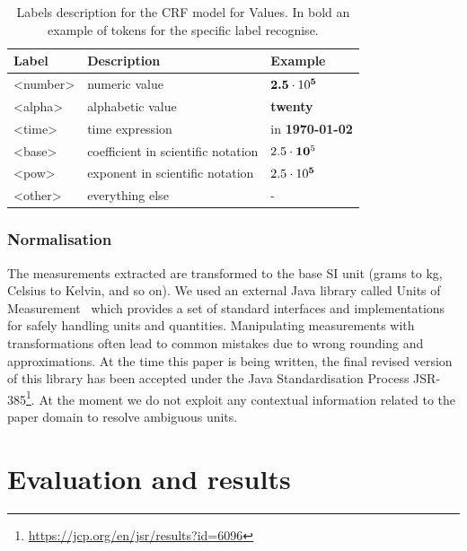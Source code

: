 \documentclass[sigconf]{acmart}
\begin{document}
\begin{table}[ht]
  \caption{Labels description for the CRF model for Values. In bold an example of tokens for the specific label recognise.}
  \label{tab:values-model-labels}
  \begin{tabular}{lll}
    \toprule
    Label & Description & Example\\
    \midrule
    <number> & numeric value & $\textbf{2.5}\cdot10\textsuperscript{\textbf{5}}$ \\
    <alpha> & alphabetic value & \textbf{twenty} \\
    <time> & time expression  & in \textbf{1970-01-02}\\
    <base> & coefficient in scientific notation & $2.5\cdot\textbf{10}\textsuperscript{5}$\\
    <pow> & exponent in scientific notation & $2.5\cdot10\textsuperscript{\textbf{5}}$ \\
    <other> & everything else & - \\
  \bottomrule
\end{tabular}
\end{table}

\subsubsection{Normalisation}

The measurements extracted are transformed to the base SI unit (grams to kg, Celsius to Kelvin, and so on). We used an external Java library called Units of Measurement~\cite{units_of_measurement} which provides a set of standard interfaces and implementations for safely handling units and quantities. Manipulating measurements with transformations often lead to common mistakes due to wrong rounding and approximations. At the time this paper is being written, the final revised version of this library has been accepted under the Java Standardisation Process JSR-385\footnote{\url{https://jcp.org/en/jsr/results?id=6096}}. 
At the moment we do not exploit any contextual information related to the paper domain to resolve ambiguous units.  


\section{Evaluation and results}
\label{sec:results}
\end{document}
